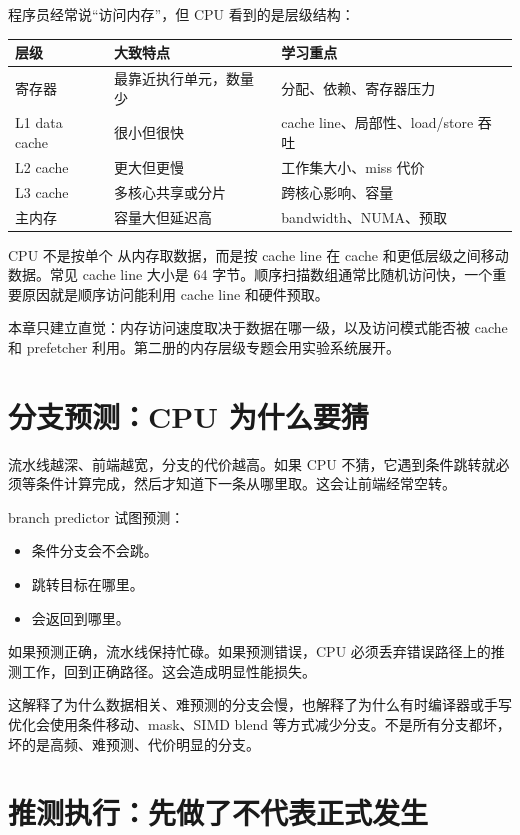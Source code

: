程序员经常说``访问内存''，但 CPU 看到的是层级结构：

\begin{center}
\begin{tabular}{lll}
\toprule
层级 & 大致特点 & 学习重点 \\
\midrule
寄存器 & 最靠近执行单元，数量少 & 分配、依赖、寄存器压力 \\
L1 data cache & 很小但很快 & cache line、局部性、load/store 吞吐 \\
L2 cache & 更大但更慢 & 工作集大小、miss 代价 \\
L3 cache & 多核心共享或分片 & 跨核心影响、容量 \\
主内存 & 容量大但延迟高 & bandwidth、NUMA、预取 \\
\bottomrule
\end{tabular}
\end{center}

CPU 不是按单个  从内存取数据，而是按 cache line 在 cache 和更低层级之间移动数据。常见 cache line 大小是 64 字节。顺序扫描数组通常比随机访问快，一个重要原因就是顺序访问能利用 cache line 和硬件预取。

本章只建立直觉：内存访问速度取决于数据在哪一级，以及访问模式能否被 cache 和 prefetcher 利用。第二册的内存层级专题会用实验系统展开。

\section{分支预测：CPU 为什么要猜}

流水线越深、前端越宽，分支的代价越高。如果 CPU 不猜，它遇到条件跳转就必须等条件计算完成，然后才知道下一条从哪里取。这会让前端经常空转。

branch predictor 试图预测：

\begin{itemize}
  \item 条件分支会不会跳。
  \item 跳转目标在哪里。
  \item {} 会返回到哪里。
\end{itemize}

如果预测正确，流水线保持忙碌。如果预测错误，CPU 必须丢弃错误路径上的推测工作，回到正确路径。这会造成明显性能损失。

这解释了为什么数据相关、难预测的分支会慢，也解释了为什么有时编译器或手写优化会使用条件移动、mask、SIMD blend 等方式减少分支。不是所有分支都坏，坏的是高频、难预测、代价明显的分支。

\section{推测执行：先做了不代表正式发生}


